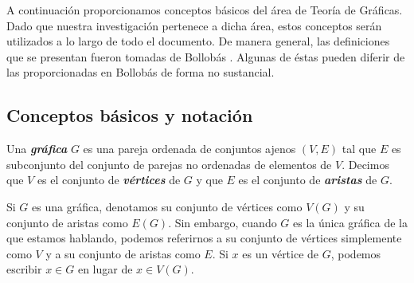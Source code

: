 



A continuación proporcionamos conceptos básicos del área de Teoría de Gráficas. Dado que nuestra investigación pertenece a dicha área, estos conceptos serán utilizados a lo largo de todo el documento. De manera general, las definiciones que se presentan fueron tomadas de Bollobás \cite{Bollobas}. Algunas de éstas pueden diferir de las proporcionadas en Bollobás \cite{Bollobas} de forma no sustancial.

\subsection{Conceptos básicos y notación}

Una \textbf{\emph{gráfica}} $G$ es una pareja ordenada de conjuntos ajenos $(V,E)$ tal que $E$ es subconjunto del conjunto de parejas no ordenadas de elementos de $V$. Decimos que $V$ es el conjunto de \textbf{\emph{vértices}} de $G$ y que $E$ es el conjunto de \textbf{\emph{aristas}} de $G$.

Si $G$ es una gráfica, denotamos su conjunto de vértices como $V(G)$ y su conjunto de aristas como $E(G)$. Sin embargo, cuando $G$ es la única gráfica de la que estamos hablando, podemos referirnos a su conjunto de vértices simplemente como $V$ y a su conjunto de aristas como $E$. Si $x$ es un vértice de $G$, podemos escribir $x\in G$ en lugar de $x \in V(G)$.

